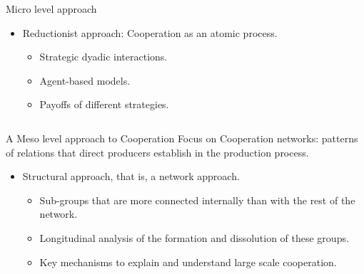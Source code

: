 \documentclass[ignorenonframetext,red,8pt,notes=hide]{beamer}
\begin{document}
\begin{frame}[label=]
\begin{columns}[c]
\begin{column}{0.5\textwidth}
\begin{block}{Micro level approach}
\begin{itemize}
\item Reductionist approach: Cooperation as an atomic process.

\begin{itemize}

\item Strategic dyadic interactions.
\item Agent-based models.
\item Payoffs of different strategies.

\end{itemize}
\end{itemize}

\end{block}

\end{column}
\end{columns}

\pause

\begin{block}{A Meso level approach to Cooperation}
Focus on Cooperation networks: patterns of relations that direct producers establish in the production process.
\begin{itemize}

\item Structural approach, that is, a network approach.

\begin{itemize}

\item Sub-groups that are more connected internally than with the rest of the network. 
\item Longitudinal analysis of the formation and dissolution of these groups.
\item Key mechanisms to explain and understand large scale cooperation.

\end{itemize}
\end{itemize}
\end{block}

\end{frame}
\end{document}
